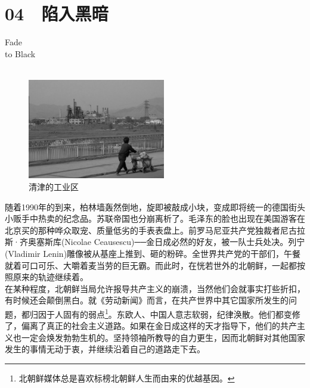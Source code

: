 \fancyhead[RO]{{\tiny{\textcolor{Gray}{\FA \ }}}\thepage}
\fancyhead[LE]{{\tiny{\textcolor{Gray}{\FA \ }}}\thepage}
\fancyfoot[LE,RO]{}
\fancyfoot[LO,CE]{}
\fancyfoot[CO,RE]{}
\chapter*{04 {\FA } 陷入黑暗}
\vspace{5mm}
\begin{flushright}
	\textcolor{PinYinColor}{\EN \huge{Fade\\
	to Black\\
	\ \\}}
\end{flushright}
\begin{figure}[!htbp]
	\centering
	\includegraphics[width=6cm]{./Chapters/Images/04.jpg}
	\caption*{清津的工业区}
\end{figure}


随着1990年的到来，柏林墙轰然倒地，旋即被敲成小块，变成即将统一的德国街头小贩手中热卖的纪念品。苏联帝国也分崩离析了。毛泽东的脸也出现在美国游客在北京买的那种哗众取宠、质量低劣的手表表盘上。前罗马尼亚共产党独裁者尼古拉斯·齐奥塞斯库(Nicolae Ceausescu)──金日成必然的好友，被一队士兵处决。列宁(Vladimir Lenin)雕像被从基座上推到、砸的粉碎。全世界共产党的干部们，午餐就着可口可乐、大嚼着麦当劳的巨无霸。而此时，在恍若世外的北朝鲜，一起都按照原来的轨迹继续着。\\

在某种程度，北朝鲜当局允许报导共产主义的崩溃，当然他们会就事实打些折扣，有时候还会颠倒黑白。就《劳动新闻》而言，在共产世界中其它国家所发生的问题，都归因于人固有的弱点\footnote{北朝鲜媒体总是喜欢标榜北朝鲜人生而由来的优越基因。}。东欧人、中国人意志软弱，纪律涣散。他们都变修了，偏离了真正的社会主义道路。如果在金日成这样的天才指导下，他们的共产主义也一定会焕发勃勃生机的。坚持领袖所教导的自力更生，因而北朝鲜对其他国家发生的事情无动于衷，并继续沿着自己的道路走下去。\\

